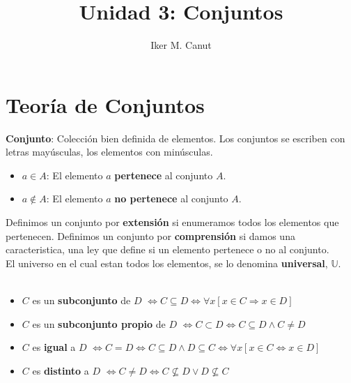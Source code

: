 \documentclass[11pt,a4paper]{article}
\author{Iker M. Canut}
\title{Unidad 3: Conjuntos}
\begin{document}
\maketitle
\newpage
\section{Teor\'ia de Conjuntos}
\textbf{Conjunto}: Colecci\'on bien definida de elementos. Los conjuntos se escriben con letras may\'usculas, los elementos con min\'usculas.
\begin{itemize}
\item $a \in A$: El elemento $a$ \textbf{pertenece} al conjunto $A$.
\item $a \not \in A$: El elemento $a$ \textbf{no pertenece} al conjunto $A$.
\end{itemize}
Definimos un conjunto por \textbf{extensi\'on} si enumeramos todos los elementos que pertenecen. Definimos un conjunto por \textbf{comprensi\'on} si damos una caracteristica, una ley que define si un elemento pertenece o no al conjunto.\\

El universo en el cual estan todos los elementos, se lo denomina \textbf{universal}, $\mathbb{U}$.\\

\noindent \dotfill\\

\begin{itemize}
\item $C$ es un \textbf{subconjunto} de $D$ $\iff C \subseteq D \iff \forall x[x \in C \Rightarrow x \in D]$

\item $C$ es un \textbf{subconjunto propio} de $D$ $\iff C \subset D \iff C \subseteq D \land C \not = D$

\item $C$ es \textbf{igual} a $D$ $\iff C = D \iff C \subseteq D \land D \subseteq C \iff \forall x[x \in C \iff x \in D]$
\item $C$ es \textbf{distinto} a $D$ $\iff C \not = D \iff C \not \subseteq D \lor D \not \subseteq C$
\end{itemize}
\noindent \dotfill\\
\end{document}
